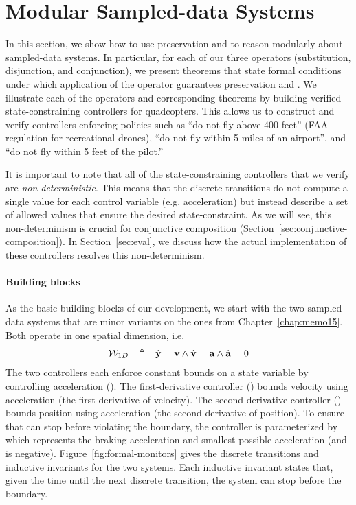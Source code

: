 \section{Modular Sampled-data Systems}
\label{sec:compositional-monitors}

In this section, we show how to use preservation and \progress{} to reason
modularly about sampled-data systems.  In particular, for each of our three
operators (substitution, disjunction, and conjunction), we present theorems
that state formal conditions under which application of the operator
guarantees preservation and \progress{}.  We illustrate each of the
operators and corresponding theorems by building verified
state-constraining controllers for quadcopters.  This allows us to
construct and verify controllers enforcing policies such as ``do not fly
above 400 feet'' (FAA regulation for recreational drones), ``do not fly
within 5 miles of an airport'', and ``do not fly within 5 feet of the
pilot.''

It is important to note that all of the state-constraining controllers that
we verify are \emph{non-deterministic}.  This means that the discrete
transitions do not compute a single value for each control variable
(e.g. acceleration) but instead describe a set of allowed values that
ensure the desired state-constraint.  As we will see, this non-determinism
is crucial for conjunctive composition
(Section~\ref{sec:conjunctive-composition}).  In Section~\ref{sec:eval}, we
discuss how the actual implementation of these controllers resolves this
non-determinism.

\paragraph{Building blocks}
As the basic building blocks of our development, we start with the two
sampled-data systems that are minor variants on the ones from
Chapter~\ref{chap:memo15}. Both operate in one spatial dimension, i.e.
\[\begin{array}{rcl}
\mathcal{W}_{1D} & \triangleq & \dot{\mathbf{y}} = \mathbf{v} \wedge \dot{\mathbf{v}} = \mathbf{a} \wedge \dot{\mathbf{a}} = 0
\end{array}
\]
The two controllers each enforce constant bounds on a state variable by
controlling acceleration ().  The first-derivative controller
(\derivShimv) bounds velocity using acceleration (the first-derivative of
velocity).  The second-derivative controller (\derivShimx) bounds position
using acceleration (the second-derivative of position).  To ensure that
\derivShimx{} can stop before violating the boundary, the controller is
parameterized by \Tmin which represents the braking acceleration and
smallest possible acceleration (and is negative).
Figure~\ref{fig:formal-monitors} gives the discrete transitions and
inductive invariants for the two systems. Each inductive invariant states
that, given the time until the next discrete transition, the system can
stop before the boundary.



